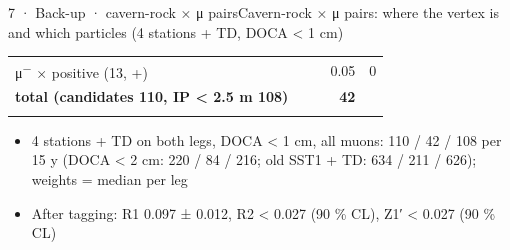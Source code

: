 \begin{btframe}{7 · Back-up · cavern-rock × μ pairs}{Cavern-rock × μ pairs: where the vertex is and which particles (4 stations + TD, DOCA < 1 cm)}
\begin{minipage}[t]{\dimexpr(0.50\linewidth-0.50\dimexpr9.67pt\relax)}
{\begin{tabularx}{\linewidth}{>{\raggedright\arraybackslash}Xrrrr}
μ\textsuperscript{−} × positive (13, +) & & & 0.05 & 0 \\\rowrule
\rowcolor{tint}\bfseries total (candidates 110, IP < 2.5 m 108) & & & \bfseries 42 & \\\rowrule
\end{tabularx}\par}
\vspace{2pt}
\begin{itemize}
  \item 4 stations + TD on both legs, DOCA < 1 cm, all muons: 110 / 42 / 108 per 15 y (DOCA < 2 cm: 220 / 84 / 216; old SST1 + TD: 634 / 211 / 626); weights = median per leg
  \item After tagging: R1 0.097 ± 0.012, R2 < 0.027 (90 \% CL), Z1′ < 0.027 (90 \% CL)
\end{itemize}
\end{minipage}\par
\end{btframe}

